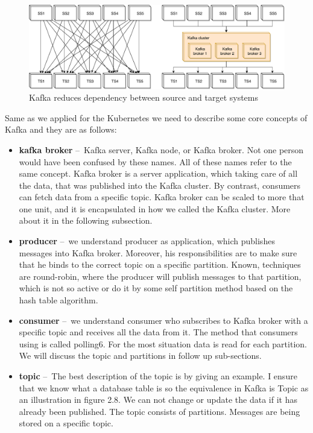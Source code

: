 \documentclass{ExcelAtFIT}
\begin{document}
\begin{figure}[h!t]
	\centering
	\includegraphics[width=0.9\linewidth]{images/02-strimzi/KafkaReduceDependencyBig.pdf}
	\caption{Kafka reduces dependency between source and target systems}
	\label{fig:externalSystem:kafkaReduceDependency}
\end{figure}

Same as we applied for the Kubernetes we need to describe some core concepts of Kafka and they are as follows:
\begin{itemize}
    \item \textbf{kafka broker} \---\ Kafka server, Kafka node, or Kafka broker. Not one person would have been confused by these names. All of these names refer to the same concept. Kafka broker is a server application, which taking care of all the data, that was published into the Kafka cluster. By contrast, consumers can fetch data from a specific topic. Kafka broker can be scaled to more that one unit, and it is encapsulated in how we called the Kafka cluster. More about it in the following subsection.
	\item \textbf{producer} \---\ we understand producer as application, which publishes messages into Kafka broker. Moreover, his responsibilities are to make sure that he binds to the correct topic on a specific partition. Known, techniques are round-robin, where the producer will publish messages to that partition, which is not so active or do it by some self partition method based on the hash table algorithm.
	\item \textbf{consumer} \---\ we understand consumer who subscribes to Kafka broker with a specific topic and receives all the data from it. The method that consumers using is called polling6. For the most situation data is read for each partition. We will discuss the topic and partitions in follow up sub-sections.
 	\item \textbf{topic} \---\ The best description of the topic is by giving an example. I ensure that we know what a database table is so the equivalence in Kafka is Topic as an illustration in figure 2.8. We can not change or update the data if it has already been published. The topic consists of partitions. Messages are being stored on a specific topic.
\end{itemize}
\end{document}

